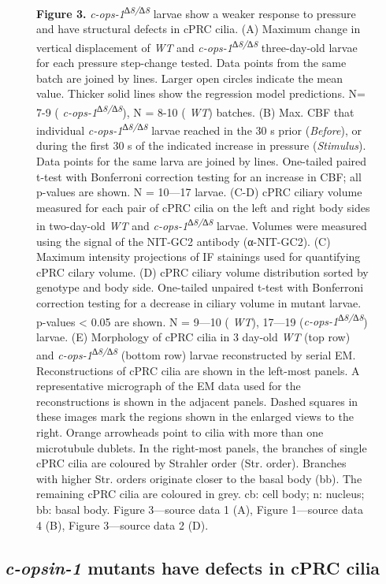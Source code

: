 \documentclass[
  11pt,
]{article}
\begin{document}
\begin{figure}[H]
\caption{\textbf{Figure 3.} \emph{c-ops-1\textsuperscript{∆8/∆8}} larvae
show a weaker response to pressure and have structural defects in cPRC
cilia. (A) Maximum change in vertical displacement of \emph{WT} and
\emph{c-ops-1\textsuperscript{∆8/∆8}} three-day-old larvae for each
pressure step-change tested. Data points from the same batch are joined
by lines. Larger open circles indicate the mean value. Thicker solid
lines show the regression model predictions. N= 7-9 (
\emph{c-ops-1\textsuperscript{∆8/∆8}}), N = 8-10 ( \emph{WT}) batches.
(B) Max. CBF that individual \emph{c-ops-1\textsuperscript{∆8/∆8}}
larvae reached in the 30 s prior (\emph{Before}), or during the first 30
s of the indicated increase in pressure (\emph{Stimulus}). Data points
for the same larva are joined by lines. One-tailed paired t-test with
Bonferroni correction testing for an increase in CBF; all p-values are
shown. N = 10---17 larvae. (C-D) cPRC ciliary volume measured for each
pair of cPRC cilia on the left and right body sides in two-day-old
\emph{WT} and \emph{c-ops-1\textsuperscript{∆8/∆8}} larvae. Volumes were
measured using the signal of the NIT-GC2 antibody (α-NIT-GC2). (C)
Maximum intensity projections of IF stainings used for quantifying cPRC
cilary volume. (D) cPRC ciliary volume distribution sorted by genotype
and body side. One-tailed unpaired t-test with Bonferroni correction
testing for a decrease in ciliary volume in mutant larvae. p-values
\textless{} 0.05 are shown. N = 9---10 ( \emph{WT}), 17---19
(\emph{c-ops-1\textsuperscript{∆8/∆8}}) larvae. (E) Morphology of cPRC
cilia in 3 day-old \emph{WT} (top row) and
\emph{c-ops-1\textsuperscript{∆8/∆8}} (bottom row) larvae reconstructed
by serial EM. Reconstructions of cPRC cilia are shown in the left-most
panels. A representative micrograph of the EM data used for the
reconstructions is shown in the adjacent panels. Dashed squares in these
images mark the regions shown in the enlarged views to the right. Orange
arrowheads point to cilia with more than one microtubule dublets. In the
right-most panels, the branches of single cPRC cilia are coloured by
Strahler order (Str. order). Branches with higher Str. orders originate
closer to the basal body (bb). The remaining cPRC cilia are coloured in
grey. cb: cell body; n: nucleus; bb: basal body. Figure 3---source data
1 (A), Figure 1---source data 4 (B), Figure 3---source data 2 (D).}

\end{figure}%

\subsection{\texorpdfstring{\emph{c-opsin-1} mutants have defects in
cPRC
cilia}{c-opsin-1 mutants have defects in cPRC cilia}}\label{c-opsin-1-mutants-have-defects-in-cprc-cilia}
\end{document}
